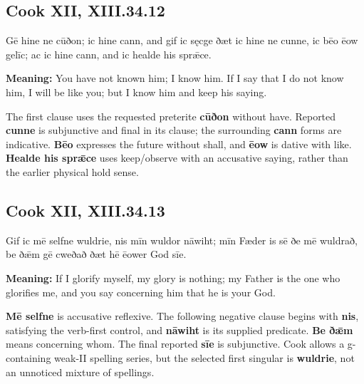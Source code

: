\par\begin{minipage}{\linewidth}\raggedright
\subsection*{Cook XII, XIII.34.12}

Gē hine ne cūðon; ic hine cann, and gif ic sęcge ðæt ic hine ne cunne, ic bēo ēow gelīc; ac ic hine cann, and ic healde his sprǣce.

\textbf{Meaning:} You have not known him; I know him. If I say that I do not know him, I will be like you; but I know him and keep his saying.

The first clause uses the requested preterite \textbf{cūðon} without have. Reported \textbf{cunne} is subjunctive and final in its clause; the surrounding \textbf{cann} forms are indicative. \textbf{Bēo} expresses the future without shall, and \textbf{ēow} is dative with like. \textbf{Healde his sprǣce} uses keep/\allowbreak{}observe with an accusative saying, rather than the earlier physical hold sense.

\end{minipage}\par\addvspace{4pt}

\par\begin{minipage}{\linewidth}\raggedright
\subsection*{Cook XII, XIII.34.13}

Gif ic mē selfne wuldrie, nis mīn wuldor nāwiht; mīn Fæder is sē ðe mē wuldrað, be ðǣm gē cweðað ðæt hē ēower God sīe.

\textbf{Meaning:} If I glorify myself, my glory is nothing; my Father is the one who glorifies me, and you say concerning him that he is your God.

\textbf{Mē selfne} is accusative reflexive. The following negative clause begins with \textbf{nis}, satisfying the verb-first control, and \textbf{nāwiht} is its supplied predicate. \textbf{Be ðǣm} means concerning whom. The final reported \textbf{sīe} is subjunctive. Cook allows a g-containing weak-II spelling series, but the selected first singular is \textbf{wuldrie}, not an unnoticed mixture of spellings.

\end{minipage}\par\addvspace{4pt}

